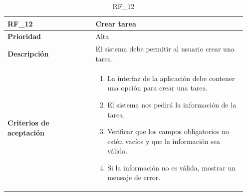 \begin{table}[htb!]
    \begin{tabular}{|p{0.35\linewidth}|p{0.6\linewidth}|}
        \hline
        \rowcolor[HTML]{C0C0C0}  
        \textbf{RF\_12} & \textbf{Crear tarea} \\
        \hline
        \textbf{Prioridad} & Alta \\
        \hline
        \textbf{Descripción} & El sistema debe permitir al usuario crear una tarea.  \\
        \hline
        \vspace{0.5mm}
        \textbf{Criterios de aceptación} & 
        \begin{minipage}[t]{0.9\linewidth}
            \begin{enumerate}
                \item La interfaz de la aplicación debe contener una opción para crear una tarea.
                \item El sistema nos pedirá la información de la tarea.
                \item Verificar que los campos  obligatorios no estén vacíos y que la información sea válida.
                \item Si la información no es válida, mostrar un mensaje de error.
            \end{enumerate}
            \vspace{2mm}
        \end{minipage} \\
        \hline
    \end{tabular}
    \caption{RF\_12}
    \label{req:RF12}
\end{table}


